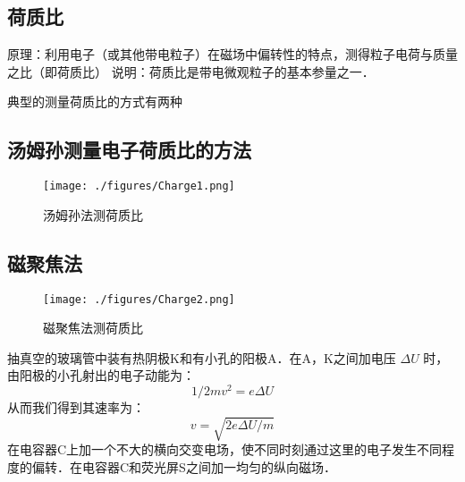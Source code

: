 
\subsection{荷质比}
原理：利用电子（或其他带电粒子）在磁场中偏转性的特点，测得粒子电荷与质量之比（即荷质比）
说明：荷质比是带电微观粒子的基本参量之一．

典型的测量荷质比的方式有两种

\subsection{汤姆孙测量电子荷质比的方法}

\begin{figure}[ht]
\centering
\texttt{[image: ./figures/Charge1.png]}
\caption{汤姆孙法测荷质比} \label{Charge_fig1}
\end{figure}

\subsection{磁聚焦法}

\begin{figure}[ht]
\centering
\texttt{[image: ./figures/Charge2.png]}
\caption{磁聚焦法测荷质比} \label{Charge_fig2}
\end{figure}

抽真空的玻璃管中装有热阴极K和有小孔的阳极A．在A，K之间加电压 $\Delta U$ 时，由阳极的小孔射出的电子动能为：\begin{equation}
1/2mv^2=e\Delta U
\end{equation}
从而我们得到其速率为：\begin{equation}
v=\sqrt{2e\Delta U/m}
\end{equation}
在电容器C上加一个不大的横向交变电场，使不同时刻通过这里的电子发生不同程度的偏转．在电容器C和荧光屏S之间加一均匀的纵向磁场．

